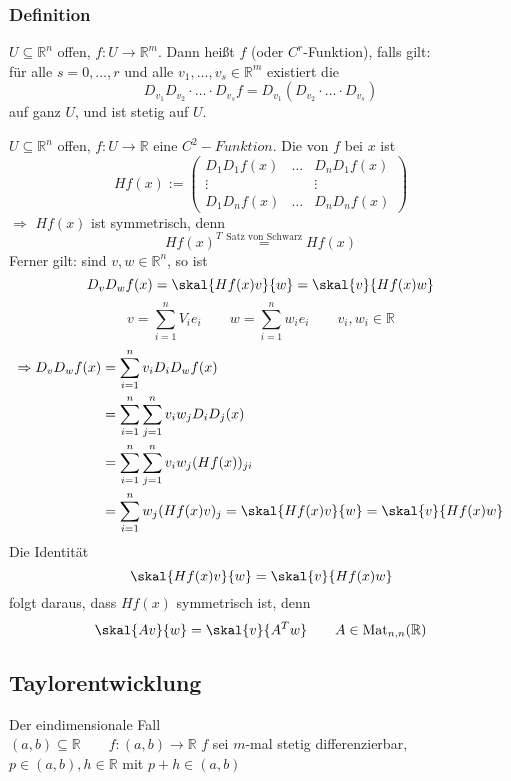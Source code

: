 \subsubsection{Definition} %
\label{ssub:definition}
$U \subseteq \mathbb{R}^n$ offen, $f: U \to \mathbb{R}^m$. Dann heißt $f$  (oder $C^r$-Funktion), falls gilt: \\
 für alle $s=0,\dots,r$ und alle $v_1,\dots,v_s \in \mathbb{R}^m$ existiert die 
 \[
 	D_{v_1}D_{v_2} \cdot \dots \cdot D_{v_s}f = D_{v_1}(D_{v_2} \cdot \dots \cdot D_{v_s}) 
 \]
 auf ganz $U$, und ist stetig auf $U$.
 
 $U \subseteq \mathbb{R}^n$ offen, $f: U \to \mathbb{R}$ eine $C^2-Funktion$. Die  von $f$ bei $x$ ist
 \[
 	Hf(x):= \begin{pmatrix}
 		D_1D_1f(x) & \dots & D_nD_1f(x) \\
		\vdots & & \vdots \\
		D_1D_nf(x) & \dots & D_nD_nf(x)
 	\end{pmatrix}
 \]
 $\Rightarrow$ $Hf(x)$ ist symmetrisch, denn
 \[
 	Hf(x)^T \stackrel{\text{Satz von Schwarz}}{=} Hf(x)
 \] 
 Ferner gilt: sind $v,w \in \mathbb{R}^n$, so ist
 \[
 	D_vD_wf(x)= \skal{Hf(x)v}{w}=\skal{v}{Hf(x)w}
 \]
  \[
 	v= \sum^{n}_{i=1}V_ie_i \qquad w=\sum^{n}_{i=1}w_ie_i \qquad v_i,w_i \in \mathbb{R}
 \]
\begin{align*}
	\Rightarrow D_vD_wf(x)&= \sum^{n}_{i=1}v_iD_iD_wf(x) \\ &= \sum^{n}_{i=1}\sum^{n}_{j=1}v_iw_jD_iD_j(x) \\ &= \sum^{n}_{i=1}\sum^{n}_{j=1}v_iw_j(Hf(x))_{ji} \\
	&= \sum^{n}_{i=1}w_j(Hf(x)v)_j = \skal{Hf(x)v}{w}= \skal{v}{Hf(x)w}
\end{align*}
Die Identität
\[
	\skal{Hf(x)v}{w}=\skal{v}{Hf(x)w} 
\] folgt daraus, dass $Hf(x)$ symmetrisch ist, denn
\[
	\skal{Av}{w}=\skal{v}{A^Tw} \qquad A \in \Mat_{n,n}(\mathbb{R})
\]
\subsection{Taylorentwicklung} %
\label{sub:taylorentwicklung}
Der eindimensionale Fall \\
$(a,b) \subseteq \mathbb{R} \qquad f:(a,b) \to \mathbb{R}$
$f$ sei $m$-mal stetig differenzierbar, $p \in (a,b), h \in \mathbb{R}$ mit $p+h \in (a,b)$

